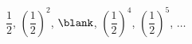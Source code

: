 $\dfrac{1}{2}$, $\left(\dfrac{1}{2}\right)^{2}$, $\blank$, $\left(\dfrac{1}{2}\right)^{4}$, $\left(\dfrac{1}{2}\right)^{5}$, $\ldots$

